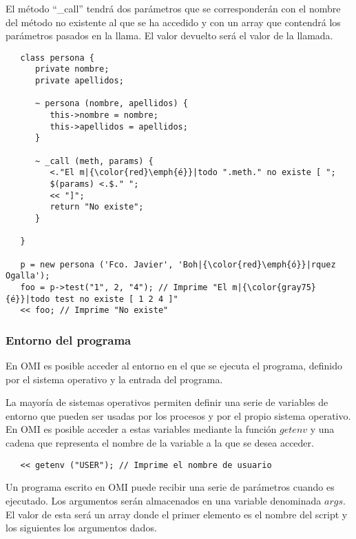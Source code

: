 El método ``\_call'' tendrá dos parámetros que se corresponderán con 
el nombre del método no existente al que se ha accedido y 
con un array que contendrá los parámetros pasados en la llama. El valor devuelto
será el valor de la llamada. \\

\begin{lstlisting}
   class persona {
      private nombre;
      private apellidos;
      
      ~ persona (nombre, apellidos) {
         this->nombre = nombre;
         this->apellidos = apellidos;
      }
      
      ~ _call (meth, params) {
         <."El m|{\color{red}\emph{é}}|todo ".meth." no existe [ ";
         $(params) <.$." ";
         << "]";
         return "No existe";
      }
      
   }
   
   p = new persona ('Fco. Javier', 'Boh|{\color{red}\emph{ó}}|rquez Ogalla');
   foo = p->test("1", 2, "4"); // Imprime "El m|{\color{gray75}{é}}|todo test no existe [ 1 2 4 ]"
   << foo; // Imprime "No existe"
\end{lstlisting}

\subsubsection{Entorno del programa} \label{sec:environment}

En OMI es posible  acceder al entorno en el que se ejecuta el programa, definido por el sistema 
operativo y la entrada del programa. 

La mayoría de sistemas operativos permiten definir una serie de variables de entorno que pueden ser usadas
por los procesos y por el propio sistema operativo. En OMI es posible acceder a estas variables
mediante la función $getenv$ y una cadena que representa el nombre de la variable a la que se desea acceder. \\

\begin{lstlisting}
   << getenv ("USER"); // Imprime el nombre de usuario 
\end{lstlisting}

Un programa escrito en OMI puede recibir una serie de parámetros cuando es ejecutado. Los argumentos serán almacenados
en una variable denominada $args$. El valor de esta será un array donde el primer elemento es el nombre del script y los siguientes
los argumentos dados. \\

